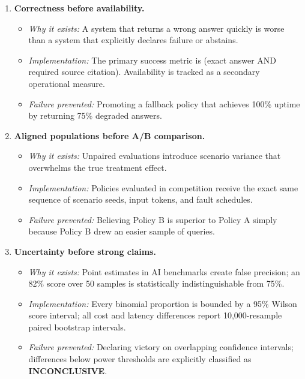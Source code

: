 \begin{enumerate}
    \item \textbf{Correctness before availability.}
    \begin{itemize}
        \item \textit{Why it exists:} A system that returns a wrong answer quickly is worse than a system that explicitly declares failure or abstains.
        \item \textit{Implementation:} The primary success metric is  (exact answer AND required source citation). Availability is tracked as a secondary operational measure.
        \item \textit{Failure prevented:} Promoting a fallback policy that achieves 100\% uptime by returning 75\% degraded answers.
    \end{itemize}

    \item \textbf{Aligned populations before A/B comparison.}
    \begin{itemize}
        \item \textit{Why it exists:} Unpaired evaluations introduce scenario variance that overwhelms the true treatment effect.
        \item \textit{Implementation:} Policies evaluated in competition receive the exact same sequence of scenario seeds, input tokens, and fault schedules.
        \item \textit{Failure prevented:} Believing Policy B is superior to Policy A simply because Policy B drew an easier sample of queries.
    \end{itemize}

    \item \textbf{Uncertainty before strong claims.}
    \begin{itemize}
        \item \textit{Why it exists:} Point estimates in AI benchmarks create false precision; an 82\% score over 50 samples is statistically indistinguishable from 75\%.
        \item \textit{Implementation:} Every binomial proportion is bounded by a 95\% Wilson score interval; all cost and latency differences report 10,000-resample paired bootstrap intervals.
        \item \textit{Failure prevented:} Declaring victory on overlapping confidence intervals; differences below power thresholds are explicitly classified as \textbf{INCONCLUSIVE}.
    \end{itemize}


\end{enumerate}
